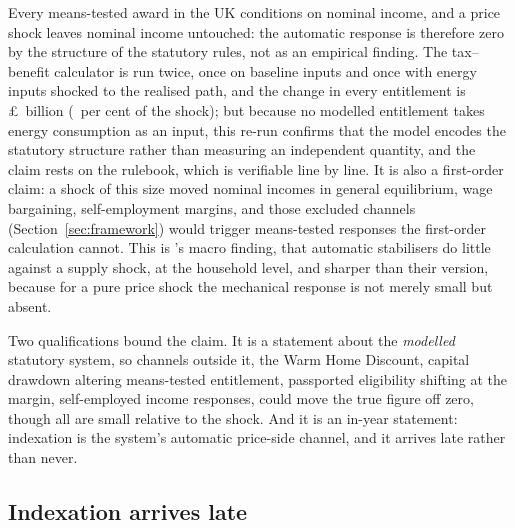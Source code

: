 Every means-tested award in the UK conditions on nominal income, and a
price shock leaves nominal income untouched: the automatic response is
therefore zero by the structure of the statutory rules, not as an
empirical finding. The tax--benefit calculator is run twice, once on
baseline inputs and once with energy inputs shocked to the realised
path, and the change in every entitlement is
\pounds\SsAutomaticBn\ billion (\SsAutomaticRatePct\ per cent of the
shock); but because no modelled entitlement takes energy consumption as
an input, this re-run confirms that the model encodes the statutory
structure rather than measuring an independent quantity, and the claim
rests on the rulebook, which is verifiable line by line. It is also a
first-order claim: a shock of this size moved nominal incomes in
general equilibrium, wage bargaining, self-employment margins, and
those excluded channels (Section~\ref{sec:framework}) would trigger
means-tested responses the first-order calculation cannot. This is
\citet{cohenfollette2000}'s macro finding, that automatic stabilisers
do little against a supply shock, at the household level, and sharper
than their version, because for a pure price shock the mechanical
response is not merely small but absent.

Two qualifications bound the claim. It is a statement about the
\emph{modelled} statutory system, so channels outside it, the Warm
Home Discount, capital drawdown altering means-tested entitlement,
passported eligibility shifting at the margin, self-employed income
responses, could move the true figure off zero, though all are small
relative to the shock. And it is an in-year statement: indexation is
the system's automatic price-side channel, and it arrives late rather
than never.

\subsection{Indexation arrives late}

